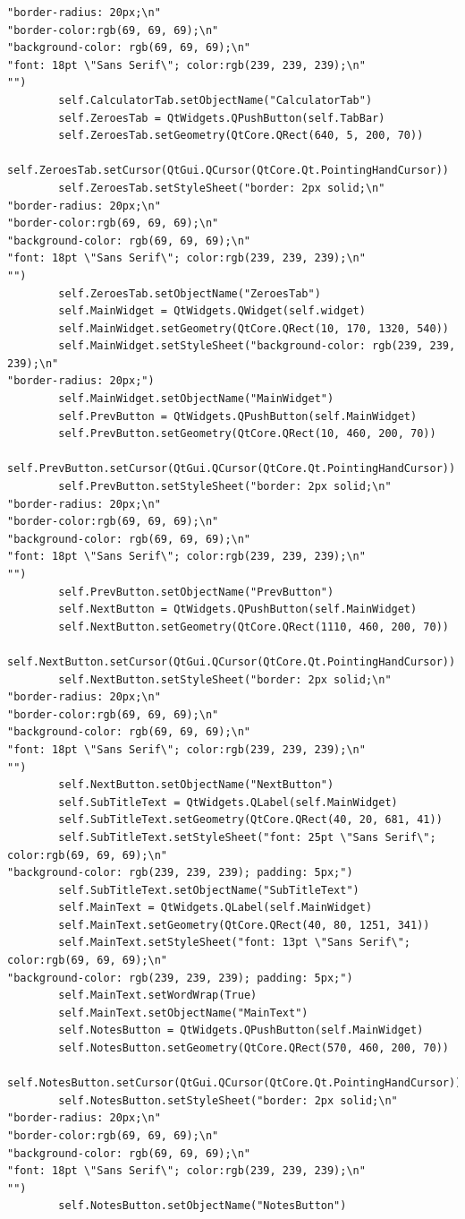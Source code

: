 \documentclass{article}
\begin{document}
\begin{lstlisting}
"border-radius: 20px;\n"
"border-color:rgb(69, 69, 69);\n"
"background-color: rgb(69, 69, 69);\n"
"font: 18pt \"Sans Serif\"; color:rgb(239, 239, 239);\n"
"")
        self.CalculatorTab.setObjectName("CalculatorTab")
        self.ZeroesTab = QtWidgets.QPushButton(self.TabBar)
        self.ZeroesTab.setGeometry(QtCore.QRect(640, 5, 200, 70))
        self.ZeroesTab.setCursor(QtGui.QCursor(QtCore.Qt.PointingHandCursor))
        self.ZeroesTab.setStyleSheet("border: 2px solid;\n"
"border-radius: 20px;\n"
"border-color:rgb(69, 69, 69);\n"
"background-color: rgb(69, 69, 69);\n"
"font: 18pt \"Sans Serif\"; color:rgb(239, 239, 239);\n"
"")
        self.ZeroesTab.setObjectName("ZeroesTab")
        self.MainWidget = QtWidgets.QWidget(self.widget)
        self.MainWidget.setGeometry(QtCore.QRect(10, 170, 1320, 540))
        self.MainWidget.setStyleSheet("background-color: rgb(239, 239, 239);\n"
"border-radius: 20px;")
        self.MainWidget.setObjectName("MainWidget")
        self.PrevButton = QtWidgets.QPushButton(self.MainWidget)
        self.PrevButton.setGeometry(QtCore.QRect(10, 460, 200, 70))
        self.PrevButton.setCursor(QtGui.QCursor(QtCore.Qt.PointingHandCursor))
        self.PrevButton.setStyleSheet("border: 2px solid;\n"
"border-radius: 20px;\n"
"border-color:rgb(69, 69, 69);\n"
"background-color: rgb(69, 69, 69);\n"
"font: 18pt \"Sans Serif\"; color:rgb(239, 239, 239);\n"
"")
        self.PrevButton.setObjectName("PrevButton")
        self.NextButton = QtWidgets.QPushButton(self.MainWidget)
        self.NextButton.setGeometry(QtCore.QRect(1110, 460, 200, 70))
        self.NextButton.setCursor(QtGui.QCursor(QtCore.Qt.PointingHandCursor))
        self.NextButton.setStyleSheet("border: 2px solid;\n"
"border-radius: 20px;\n"
"border-color:rgb(69, 69, 69);\n"
"background-color: rgb(69, 69, 69);\n"
"font: 18pt \"Sans Serif\"; color:rgb(239, 239, 239);\n"
"")
        self.NextButton.setObjectName("NextButton")
        self.SubTitleText = QtWidgets.QLabel(self.MainWidget)
        self.SubTitleText.setGeometry(QtCore.QRect(40, 20, 681, 41))
        self.SubTitleText.setStyleSheet("font: 25pt \"Sans Serif\"; color:rgb(69, 69, 69);\n"
"background-color: rgb(239, 239, 239); padding: 5px;")
        self.SubTitleText.setObjectName("SubTitleText")
        self.MainText = QtWidgets.QLabel(self.MainWidget)
        self.MainText.setGeometry(QtCore.QRect(40, 80, 1251, 341))
        self.MainText.setStyleSheet("font: 13pt \"Sans Serif\"; color:rgb(69, 69, 69);\n"
"background-color: rgb(239, 239, 239); padding: 5px;")
        self.MainText.setWordWrap(True)
        self.MainText.setObjectName("MainText")
        self.NotesButton = QtWidgets.QPushButton(self.MainWidget)
        self.NotesButton.setGeometry(QtCore.QRect(570, 460, 200, 70))
        self.NotesButton.setCursor(QtGui.QCursor(QtCore.Qt.PointingHandCursor))
        self.NotesButton.setStyleSheet("border: 2px solid;\n"
"border-radius: 20px;\n"
"border-color:rgb(69, 69, 69);\n"
"background-color: rgb(69, 69, 69);\n"
"font: 18pt \"Sans Serif\"; color:rgb(239, 239, 239);\n"
"")
        self.NotesButton.setObjectName("NotesButton")


\end{lstlisting}
\end{document}
